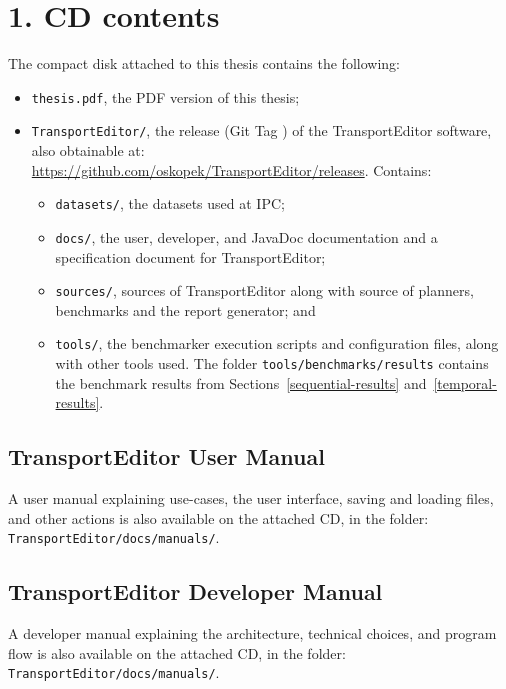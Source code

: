 
\section*{1. CD contents}\label{cd-contents}

The compact disk attached to this thesis contains the following:

\begin{itemize}
\item \verb+thesis.pdf+, the PDF version of this thesis;
\item \verb+TransportEditor/+, the \TEver{} release (Git Tag \TEtag{}) of the TransportEditor software, also obtainable at:\\
\url{https://github.com/oskopek/TransportEditor/releases}. Contains:
\begin{itemize}
\item \verb+datasets/+, the datasets used at IPC;
\item \verb+docs/+, the user, developer, and JavaDoc documentation and a specification document for TransportEditor;
\item \verb+sources/+, sources of TransportEditor along with source of planners, benchmarks and the report generator; and
\item \verb+tools/+, the benchmarker execution scripts and configuration files, along with other tools used. The folder \verb+tools/benchmarks/results+ contains the benchmark results
from Sections~\ref{sequential-results} and~\ref{temporal-results}.
\end{itemize}
\end{itemize}

\subsection*{TransportEditor User Manual}\label{transporteditor-user-manual}

A user manual explaining use-cases, the user interface, saving and loading files,
and other actions is also available on the attached CD, in the folder:\\
\verb+TransportEditor/docs/manuals/+.

\subsection*{TransportEditor Developer Manual}\label{transporteditor-developer-manual}

A developer manual explaining the architecture, technical choices, and program flow
is also available on the attached CD, in the folder:\\
\verb+TransportEditor/docs/manuals/+.

